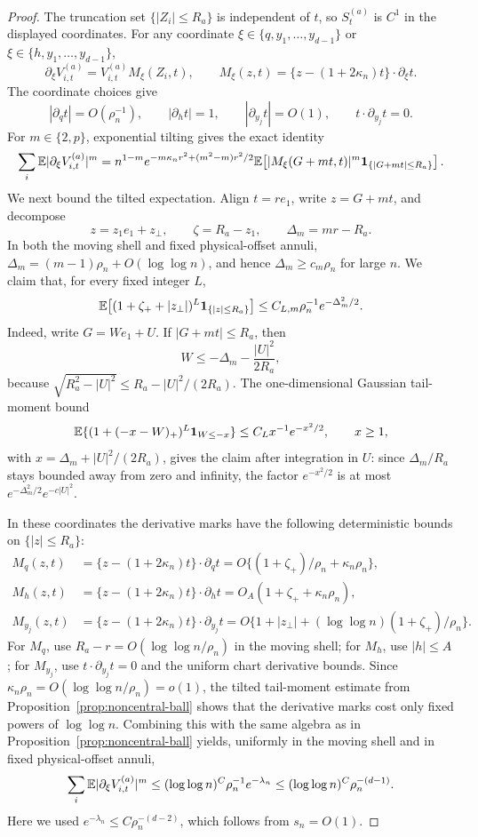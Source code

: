 \begin{proof}
The truncation set \(\{|Z_i|\le R_a\}\) is independent of \(t\), so
\(S_t^{(a)}\) is \(C^1\) in the displayed coordinates.  For any coordinate
\(\xi\in\{q,y_1,\ldots,y_{d-1}\}\) or
\(\xi\in\{h,y_1,\ldots,y_{d-1}\}\),
\[
    \partial_\xi V_{i,t}^{(a)}
    =
    V_{i,t}^{(a)}M_\xi(Z_i,t),
    \qquad
    M_\xi(z,t)=\{z-(1+2\kappa_n)t\}\cdot\partial_\xi t .
\]
The coordinate choices give
\[
    |\partial_qt|=O(\rho_n^{-1}),\qquad
    |\partial_ht|=1,\qquad
    |\partial_{y_j}t|=O(1),\qquad
    t\cdot\partial_{y_j}t=0 .
\]
For \(m\in\{2,p\}\), exponential tilting gives the exact identity
\[
    \sum_i\mathbb E|\partial_\xi V_{i,t}^{(a)}|^m
    =
    n^{1-m}e^{-m\kappa_nr^2+(m^2-m)r^2/2}
    \mathbb E\!\left[
        |M_\xi(G+mt,t)|^m\mathbf 1_{\{|G+mt|\le R_a\}}
    \right].
\]
We next bound the tilted expectation.  Align \(t=re_1\), write
\(z=G+mt\), and decompose
\[
    z=z_1e_1+z_\perp,\qquad
    \zeta=R_a-z_1,\qquad \Delta_m=mr-R_a .
\]
In both the moving shell and fixed physical-offset annuli,
\(\Delta_m=(m-1)\rho_n+O(\log\log n)\), and hence
\(\Delta_m\ge c_m\rho_n\) for large \(n\).  We claim that, for every fixed
integer \(L\),
\[
    \mathbb E\!\left[
        (1+\zeta_+ + |z_\perp|)^L\mathbf 1_{\{|z|\le R_a\}}
    \right]
    \le
    C_{L,m}\rho_n^{-1}e^{-\Delta_m^2/2}.
\]
Indeed, write \(G=We_1+U\).  If \(|G+mt|\le R_a\), then
\[
    W\le -\Delta_m-\frac{|U|^2}{2R_a},
\]
because \(\sqrt{R_a^2-|U|^2}\le R_a-|U|^2/(2R_a)\).  The one-dimensional
Gaussian tail-moment bound
\[
    \mathbb E\{(1+(-x-W)_+)^L\mathbf 1_{W\le -x}\}
    \le C_Lx^{-1}e^{-x^2/2},\qquad x\ge1,
\]
with \(x=\Delta_m+|U|^2/(2R_a)\), gives the claim after integration in
\(U\): since \(\Delta_m/R_a\) stays bounded away from zero and infinity,
the factor \(e^{-x^2/2}\) is at most
\(e^{-\Delta_m^2/2}e^{-c|U|^2}\).

In these coordinates the derivative marks have the following deterministic
bounds on \(\{|z|\le R_a\}\):
\[
\begin{aligned}
    M_q(z,t)
    &=
    \{z-(1+2\kappa_n)t\}\cdot\partial_qt
      =O\{(1+\zeta_+)/\rho_n+\kappa_n\rho_n\},\\
    M_h(z,t)
    &=
    \{z-(1+2\kappa_n)t\}\cdot\partial_ht
      =O_A(1+\zeta_++\kappa_n\rho_n),\\
    M_{y_j}(z,t)
    &=
    \{z-(1+2\kappa_n)t\}\cdot\partial_{y_j}t
      =O\{1+|z_\perp|+(\log\log n)(1+\zeta_+)/\rho_n\}.
\end{aligned}
\]
For \(M_q\), use \(R_a-r=O(\log\log n/\rho_n)\) in the moving shell; for
\(M_h\), use \(|h|\le A\); for \(M_{y_j}\), use
\(t\cdot\partial_{y_j}t=0\) and the uniform chart derivative bounds.  Since
\(\kappa_n\rho_n=O(\log\log n/\rho_n)=o(1)\), the tilted tail-moment estimate
from Proposition~\ref{prop:noncentral-ball} shows that the derivative marks cost only fixed powers
of \(\log\log n\).  Combining this with the same algebra as in
Proposition~\ref{prop:noncentral-ball} yields, uniformly in the moving shell
and in fixed physical-offset annuli,
\[
    \sum_i\mathbb E|\partial_\xi V_{i,t}^{(a)}|^m
    \le
    (\log\log n)^C\rho_n^{-1}e^{-\lambda_n}
    \le
    (\log\log n)^C\rho_n^{-(d-1)} .
\]
Here we used \(e^{-\lambda_n}\le C\rho_n^{-(d-2)}\), which follows from
\(s_n=O(1)\).


\end{proof}
